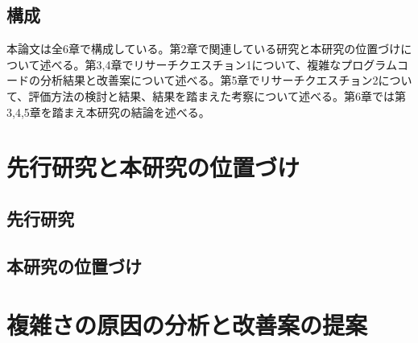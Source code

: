 \documentclass[12pt, a4paper]{jreport}
\begin{document}
\section{構成}
本論文は全6章で構成している。第2章で関連している研究と本研究の位置づけについて述べる。第3,4章でリサーチクエスチョン1について、複雑なプログラムコードの分析結果と改善案について述べる。第5章でリサーチクエスチョン2について、評価方法の検討と結果、結果を踏まえた考察について述べる。第6章では第3,4,5章を踏まえ本研究の結論を述べる。
\chapter{先行研究と本研究の位置づけ}
\section{先行研究}
\subsection{}
\subsection{}
\section{本研究の位置づけ}
\chapter{複雑さの原因の分析と改善案の提案}
\end{document}
